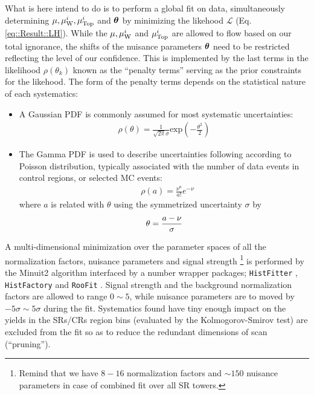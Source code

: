 What is here intend to do is to perform a global fit on data, simultaneously determining $\mu, \mu_{\mathrm{W}}^i, \mu_{\mathrm{Top}}^i$ and $\bm{\theta}$ by minimizing the likehood $\mathcal{L}$ (Eq. \ref{eq::Result::LH}). While the $\mu, \mu_{\mathrm{W}}^i$ and $\mu_{\mathrm{Top}}^i$ are allowed to flow based on our total ignorance, the shifts of the nuisance parameters $\bm{\theta}$ need to be restricted reflecting the level of our confidence. This is implemented by the last terms in the likelihood $\rho(\theta_k)$ known as the ``penalty terms'' serving as the prior constraints for the likehood. The form of the penalty terms depends on the statistical nature of each systematics:
\begin{itemize}
\item A Gaussian PDF is commonly assumed for most systematic uncertainties:
\begin{align}
\rho (\theta) = \frac{1}{\sqrt{2\pi}\sigma} \mathrm{exp} \left( - \frac{\theta^2}{2} \right)
\end{align}


\item The Gamma PDF is used to describe uncertainties following according to Poisson distribution, typically associated with the number of data events in control regions, or selected MC events:
\begin{align}
& \rho (a) = \frac{\nu^a}{a!} e^{-\nu} 
\end{align}
where $a$ is related with $\theta$ using the symmetrized uncertainty $\sigma$ by 
\begin{align}
& \theta = \frac{a-\nu}{\sigma} \nonumber \\
\end{align}
\end{itemize}

A multi-dimensional minimization over the parameter spaces of all the normalization factors, nuisance parameters and signal strength 
\footnote{Remind that we have $8-16$ normalization factors and $\sim 150$ nuisance parameters in case of combined fit over all SR towers.}
is performed by the Minuit2 algorithm \cite{minuit2} interfaced by a number wrapper packages; \texttt{HistFitter} \cite{HistFitter}, \texttt{HistFactory} \cite{HistFactory} and \texttt{RooFit} \cite{RooFit}.
Signal strength and the background normalization factors are allowed to range $0\sim5$, while nuisance parameters are to moved by $-5\sigma \sim 5\sigma$ during the fit. Systematics found have tiny enough impact on the yields in the SRs/CRs region bins (evaluated by the Kolmogorov-Smirov test) are excluded from the fit so as to reduce the redundant dimensions of scan (``pruning''). \\


